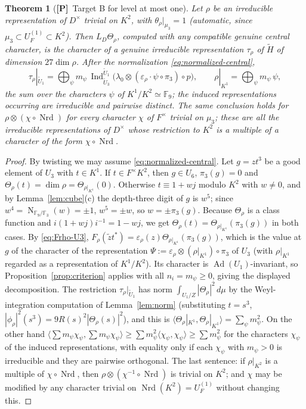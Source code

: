 \documentclass[11pt]{article}
\newcommand{\Fq}{\mathbb F}
\newcommand{\Nm}{\operatorname N}
\newcommand{\Nrd}{\operatorname{Nrd}}
\newcommand{\Ind}{\operatorname{Ind}}
\newcommand{\Ad}{\operatorname{Ad}}
\newcommand{\tH}{\widetilde H}
\newcommand{\tU}{\widetilde U}
\newcommand{\Ptag}{\textnormal{\textbf{[P]}}}
\theoremstyle{plain}
\newtheorem{theorem}{Theorem}[section]
\theoremstyle{definition}
\begin{document}
\begin{theorem}[\Ptag\ Target B for level at most one]\label{thm:levelone}
Let $\rho$ be an irreducible representation of $D^\times$ trivial on
$K^2$, with $\theta_\rho|_{\mu_3}=1$ (automatic, since $\mu_3\subset U_F^{(1)}\subset K^2$).
Then $L_D\Theta_\rho$, computed with any compatible genuine central
character, is the character of a genuine irreducible representation
$\tau_\rho$ of $\tH$ of dimension $27\dim\rho$.  After the normalization
\eqref{eq:normalized-central},
\[
 \tau_\rho|_{\tU_1}=\bigoplus_{\psi}m_\psi\,\Ind_{\tU_3}^{\tU_1}\bigl(\lambda_0\otimes(\varepsilon_\rho\cdot\psi\circ\pi_3)\circ p\bigr),
 \qquad \rho|_{K^1}=\bigoplus_\psi m_\psi\,\psi ,
\]
the sum over the characters $\psi$ of $K^1/K^2\simeq\Fq_9$; the
induced representations occurring are irreducible and pairwise
distinct.
The same conclusion holds for $\rho\otimes(\chi\circ\Nrd)$ for every
character $\chi$ of $F^\times$ trivial on $\mu_3$; these are all the
irreducible representations of $D^\times$ whose restriction to $K^2$
is a multiple of a character of the form $\chi\circ\Nrd$.
\end{theorem}
\begin{proof}
By twisting we may assume \eqref{eq:normalized-central}.  Let $g=zt^3$
be a good element of $U_3$ with $t\in K^1$.  If $t\in F^\times K^2$, then
$g\in U_6$, $\pi_3(g)=0$ and $\Theta_\rho(t)=\dim\rho=\Theta_{\rho|_{K^1}}(0)$.
Otherwise $t\equiv1+wj$ modulo $K^2$ with $w\ne0$, and by
Lemma~\ref{lem:cube}(c) the depth-three digit of $g$ is $w^5$; since
$w^4=\Nm_{\Fq_9/\Fq_3}(w)=\pm1$, $w^5=\pm w$, so $w=\pm\pi_3(g)$.  Because
$\Theta_\rho$ is a class function and $i(1+wj)i^{-1}=1-wj$, we get
$\Theta_\rho(t)=\Theta_{\rho|_{K^1}}(\pi_3(g))$ in both cases.  By
\eqref{eq:Frho-U3}, $F_\rho(\tilde zt^*)=\varepsilon_\rho(z)\Theta_{\rho|_{K^1}}(\pi_3(g))$,
which is the value at $g$ of the character of the representation
$\Psi:=\varepsilon_\rho\otimes(\rho|_{K^1})\circ\pi_3$ of $U_3$ (with
$\rho|_{K^1}$ regarded as a representation of $K^1/K^2$).  Its character
is $\Ad(U_1)$-invariant, so Proposition~\ref{prop:criterion} applies
with all $n_i=m_\psi\ge0$, giving the displayed decomposition.
The restriction $\tau_\rho|_{\tU_1}$ has norm
$\int_{U_1/Z}|\Theta_\rho|^2\,d\mu$ by the Weyl-integration computation
of Lemma~\ref{lem:norm} (substituting $t=s^3$, $|\phi_\rho|^2(s^3)=9R(s)^2|\Theta_\rho(s)|^2$),
and this is $\langle\Theta_\rho|_{K^1},\Theta_\rho|_{K^1}\rangle=\sum_\psi m_\psi^2$.
On the other hand $\langle\sum m_\psi\chi_\psi,\sum m_\psi\chi_\psi\rangle\ge\sum m_\psi^2\langle\chi_\psi,\chi_\psi\rangle\ge\sum m_\psi^2$
for the characters $\chi_\psi$ of the induced representations, with
equality only if each $\chi_\psi$ with $m_\psi>0$ is irreducible and
they are pairwise orthogonal.  The last sentence: if $\rho|_{K^2}$ is a multiple of
$\chi\circ\Nrd$, then $\rho\otimes(\chi^{-1}\circ\Nrd)$ is trivial on
$K^2$; and $\chi$ may be modified by any character trivial on
$\Nrd(K^2)=U_F^{(1)}$ without changing this.
\end{proof}
\end{document}
